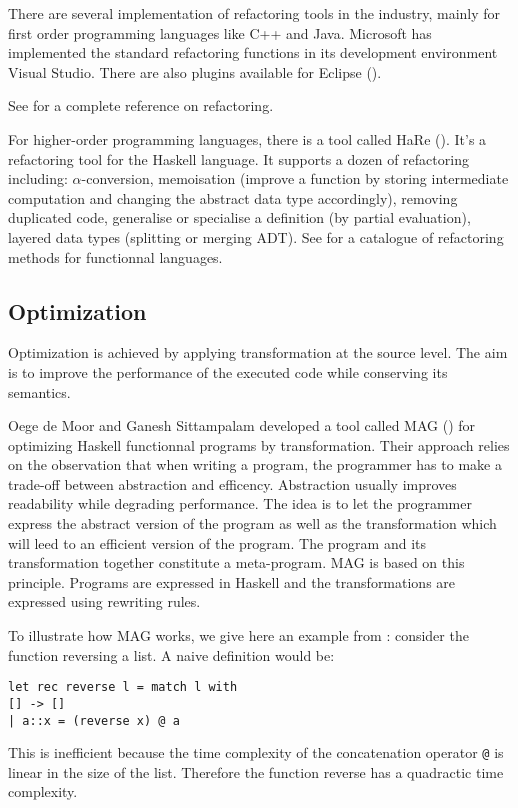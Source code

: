 \documentclass[10pt,twocolumn]{article}
\begin{document}
There are several implementation of refactoring tools in the
industry, mainly for first order programming languages like C++ and
Java. Microsoft has implemented the standard refactoring functions
in its development environment Visual Studio. There are also plugins
available for Eclipse (\cite{verbaere_msc}).

See \cite{Fowler99} for a complete reference on refactoring.

For higher-order programming languages, there is a tool called HaRe
(\cite{hare}). It's a refactoring tool for the Haskell language. It
supports a dozen of refactoring including: $\alpha$-conversion,
memoisation (improve a function by storing intermediate computation
and changing the abstract data type accordingly), removing
duplicated code, generalise or specialise a definition (by partial
evaluation), layered data types (splitting or merging ADT). See
\cite{hare-catalog} for a catalogue of refactoring methods for
functionnal languages.

\subsection{Optimization}

Optimization is achieved by applying transformation at the source level. The aim is to
improve the performance of the executed code while conserving its semantics.

Oege de Moor and Ganesh Sittampalam developed a tool called MAG (\cite{afp99moor}) for optimizing Haskell functionnal programs by transformation. Their approach relies on the observation that when writing a program, the programmer has to make a trade-off between abstraction and efficency. Abstraction usually improves readability while degrading performance. The idea is to let the programmer express the abstract version of the program as well as the transformation which will leed to an efficient version of the program. The program and its transformation together constitute a meta-program. MAG is based on this principle. Programs are expressed in Haskell and the transformations are expressed using rewriting rules.

To illustrate how MAG works, we give here an example from
\cite{afp99moor}: consider the function reversing a list. A naive
definition would be: \lstset{language=caml}
\begin{lstlisting}
let rec reverse l = match l with
[] -> []
| a::x = (reverse x) @ a
\end{lstlisting}
This is inefficient because the time complexity of the concatenation operator \verb|@| is linear in the size of the list. Therefore the function reverse has a quadractic time complexity.
\end{document}

